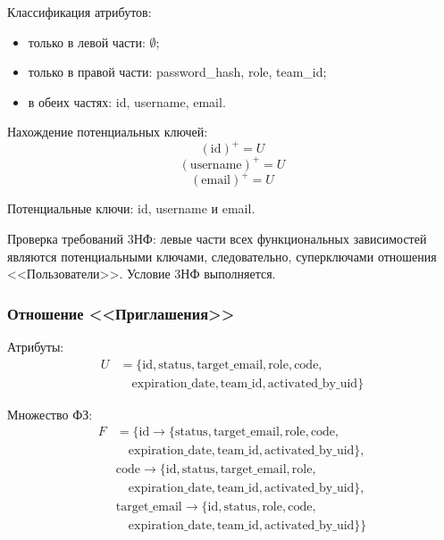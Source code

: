 Классификация атрибутов:
\begin{itemize}
    \item только в левой части: $\emptyset$;
    \item только в правой части: password\_hash, role, team\_id;
    \item в обеих частях: id, username, email.
\end{itemize}

Нахождение потенциальных ключей:
\begin{equation*}
    (\text{id})^+ = U
\end{equation*}
\begin{equation*}
    (\text{username})^+ = U
\end{equation*}
\begin{equation*}
    (\text{email})^+ = U
\end{equation*}

Потенциальные ключи: id, username и email.

Проверка требований 3НФ: левые части всех функциональных зависимостей являются потенциальными ключами,
следовательно, суперключами отношения <<Пользователи>>. Условие 3НФ выполняется.

\subsubsection{Отношение <<Приглашения>>}
Атрибуты:
\begin{align*}
    U &= \{\text{id}, \text{status}, \text{target\_email}, \text{role}, \text{code}, \\ 
    & \quad \text{expiration\_date}, \text{team\_id}, \text{activated\_by\_uid}\}    
\end{align*}

Множество ФЗ:
\begin{align*}
    F &= \{ \text{id} \to \{\text{status}, \text{target\_email}, \text{role}, \text{code}, \\ 
    & \quad \text{expiration\_date}, \text{team\_id}, \text{activated\_by\_uid}\}, \\
    & \text{code} \to \{\text{id}, \text{status}, \text{target\_email}, \text{role}, \\ 
    & \quad \text{expiration\_date}, \text{team\_id}, \text{activated\_by\_uid}\}, \\
    & \text{target\_email} \to \{\text{id}, \text{status}, \text{role}, \text{code}, \\ 
    & \quad \text{expiration\_date}, \text{team\_id}, \text{activated\_by\_uid}\} \}
\end{align*}

